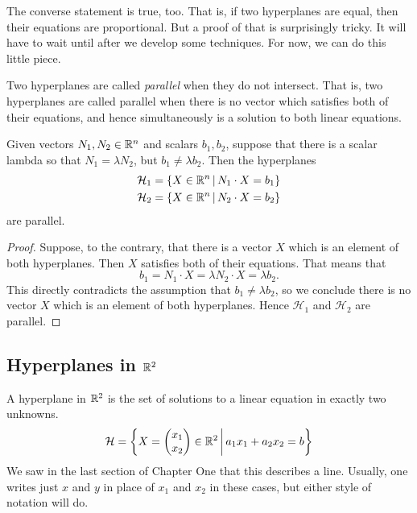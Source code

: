 \documentclass[elementsmain.tex]{subfiles}
\begin{document}
The converse statement is true, too. That is, if two hyperplanes are equal, then their equations are proportional. But a proof of that is surprisingly tricky. It will have to wait until after we develop some techniques. For now, we can do this little piece.

\begin{definition} Two hyperplanes are called \emph{parallel} when they do not intersect. That is, two hyperplanes are called parallel when there is no vector which satisfies both of their equations, and hence simultaneously is a solution to both linear equations.
\end{definition}

\begin{theorem} Given vectors $N_1, N_2 \in \mathbb{R}^n$ and scalars $b_1, b_2$, suppose that there is a scalar lambda so that $N_1 = \lambda N_2$, but $b_1 \neq \lambda b_2$. Then the hyperplanes 
\begin{align*}
\mathcal{H}_1 &= \left\{ X \in \mathbb{R}^n \,\middle|\, N_1 \cdot X = b_1 \right\} \\
\mathcal{H}_2 &= \left\{ X \in \mathbb{R}^n \,\middle|\, N_2 \cdot X = b_2 \right\} 
\end{align*} 
are parallel.
\end{theorem}

\begin{proof}
Suppose, to the contrary, that there is a vector $X$ which is an element of both hyperplanes. Then $X$ satisfies both of their equations. That means that
\[
b_1 = N_1 \cdot X = \lambda N_2 \cdot X = \lambda b_2.
\] 
This directly contradicts the assumption that $b_1 \neq \lambda b_2$, so we conclude there is no vector $X$ which is an element of both hyperplanes. Hence $\mathcal{H}_1$ and $\mathcal{H}_2$ are parallel.
\end{proof}


\subsection*{Hyperplanes in $\mathbb{R}^2$}

A hyperplane in $\mathbb{R}^2$ is the set of solutions to a linear equation in exactly two unknowns. 
\[
\mathcal{H} = \left\{ X =\begin{pmatrix}x_1 \\ x_2 \end{pmatrix} \in \mathbb{R}^2 \,\middle|\, a_1 x_1 + a_2 x_2 = b \right\}
\]
We saw in the last section of Chapter One that this describes a line. Usually, one writes just $x$ and $y$ in place of $x_1$ and $x_2$ in these cases, but either style of notation will do.
\end{document}
